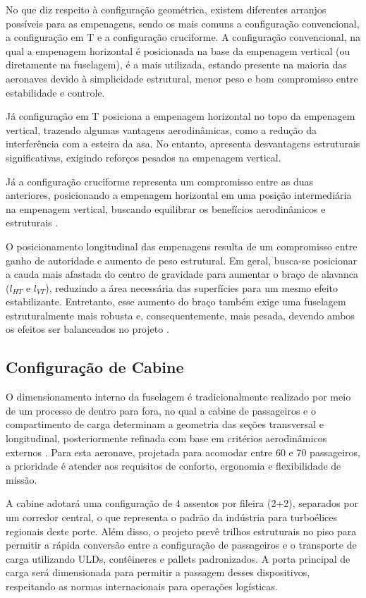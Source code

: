 No que diz respeito à configuração geométrica, existem diferentes arranjos possíveis para as empenagens, sendo os mais comuns a configuração convencional, a configuração em T e a configuração cruciforme. A configuração convencional, na qual a empenagem horizontal é posicionada na base da empenagem vertical (ou diretamente na fuselagem), é a mais utilizada, estando presente na maioria das aeronaves devido à  simplicidade estrutural, menor peso e bom compromisso entre estabilidade e controle.

Já configuração em T posiciona a empenagem horizontal no topo da empenagem vertical, trazendo algumas vantagens aerodinâmicas, como a redução da interferência com a esteira da asa. No entanto, apresenta desvantagens estruturais significativas, exigindo reforços pesados na empenagem vertical.

Já a configuração cruciforme representa um compromisso entre as duas anteriores, posicionando a empenagem horizontal em uma posição intermediária na empenagem vertical, buscando equilibrar os benefícios aerodinâmicos e estruturais \cite{anderson1999}.

O posicionamento longitudinal das empenagens resulta de um compromisso entre ganho de autoridade e aumento de peso estrutural. Em geral, busca-se posicionar a cauda mais afastada do centro de gravidade para aumentar o braço de alavanca ($l_{HT}$ e $l_{VT}$), reduzindo a área necessária das superfícies para um mesmo efeito estabilizante. Entretanto, esse aumento do braço também exige uma fuselagem estruturalmente mais robusta e, consequentemente, mais pesada, devendo ambos os efeitos ser balanceados no projeto \cite{anderson1999}.


\subsection{Configuração de Cabine}

O dimensionamento interno da fuselagem é tradicionalmente realizado por meio de um processo de dentro para fora, no qual a cabine de passageiros e o compartimento de carga determinam a geometria das seções transversal e longitudinal, posteriormente refinada com base em critérios aerodinâmicos externos \cite{raymer2018}. Para esta aeronave, projetada para acomodar entre 60 e 70 passageiros, a prioridade é atender aos requisitos de conforto, ergonomia e flexibilidade de missão.


A cabine adotará uma configuração de 4 assentos por fileira (2+2), separados por um corredor central, o que representa o padrão da indústria para turboélices regionais deste porte. Além disso, o projeto prevê trilhos estruturais no piso para permitir a rápida conversão entre a configuração de passageiros e o transporte de carga utilizando ULDs, contêineres e pallets padronizados. A porta principal de carga será dimensionada para permitir a passagem desses dispositivos, respeitando as normas internacionais para operações logísticas.

